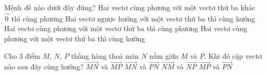 

\begin{ex}%
	Mệnh  đề nào dưới đây đúng?
	 \choice
		{\True Hai vectơ cùng phương với một vectơ thứ ba khác $\overrightarrow{0}$  thì cùng phương}
		{Hai vectơ ngược hướng với một vectơ thứ ba  thì cùng hướng}
		{Hai vectơ cùng phương với một vectơ thứ ba  thì cùng phương}
		{Hai vectơ cùng phương với một  vectơ thứ ba thì cùng hướng}
\end{ex}

\begin{ex}%
	Cho  $3$ điểm $M$, $N$, $P$ thẳng hàng thoả mãn $N$ nằm giữa $M$ và $P$. Khi đó cặp vectơ nào sau đây cùng hướng?
	\choice 
		{\True $\overrightarrow{MN}$ và $\overrightarrow{MP}$} 
		{$\overrightarrow{MN}$ và $\overrightarrow{PN}$} 
		 {$\overrightarrow{NM}$ và $\overrightarrow{NP}$}
		 {$\overrightarrow{MP}$ và $\overrightarrow{PN}$}
\end{ex}



